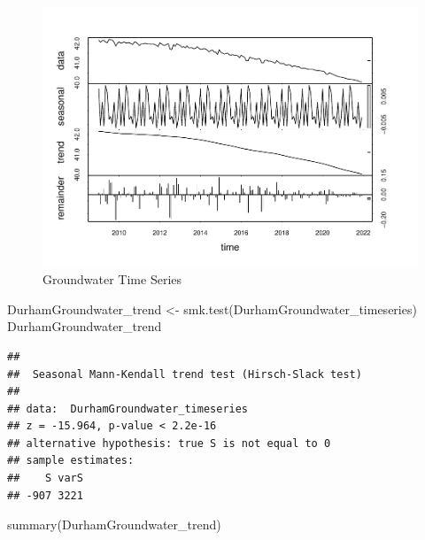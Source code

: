 \documentclass[
  12pt,
]{article}
\newenvironment{Shaded}{\begin{snugshade}}{\end{snugshade}}
\newcommand{\FunctionTok}[1]{\textcolor[rgb]{0.00,0.00,0.00}{#1}}
\newcommand{\NormalTok}[1]{#1}
\newcommand{\OtherTok}[1]{\textcolor[rgb]{0.56,0.35,0.01}{#1}}
\begin{document}
\begin{figure}
\centering
\includegraphics{Project_files/figure-latex/time-series analysis on groundwater-1.pdf}
\caption{Groundwater Time Series}
\end{figure}

\begin{Shaded}
\begin{Highlighting}[]
\NormalTok{DurhamGroundwater\_trend }\OtherTok{\textless{}{-}} \FunctionTok{smk.test}\NormalTok{(DurhamGroundwater\_timeseries)}
\NormalTok{DurhamGroundwater\_trend}
\end{Highlighting}
\end{Shaded}

\begin{verbatim}
## 
##  Seasonal Mann-Kendall trend test (Hirsch-Slack test)
## 
## data:  DurhamGroundwater_timeseries
## z = -15.964, p-value < 2.2e-16
## alternative hypothesis: true S is not equal to 0
## sample estimates:
##    S varS 
## -907 3221
\end{verbatim}

\begin{Shaded}
\begin{Highlighting}[]
\FunctionTok{summary}\NormalTok{(DurhamGroundwater\_trend)}
\end{Highlighting}
\end{Shaded}
\end{document}
